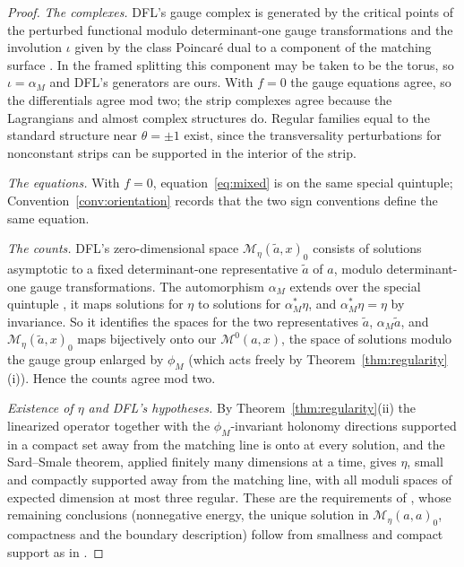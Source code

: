 \documentclass[11pt]{amsart}
\theoremstyle{definition}
\theoremstyle{remark}
\theoremstyle{plain}
\numberwithin{equation}{section}
\newcommand{\cM}{\mathcal{M}}
\begin{document}
\begin{proof}
\emph{The complexes.} DFL's gauge complex is generated by the critical points of
the perturbed functional modulo determinant-one gauge transformations and the
involution $\iota$ given by the class Poincaré dual to a component of the matching
surface \cite[pp.~18--19, Lemmas~2.43 and~2.45]{DFL}. In the framed splitting this
component may be taken to be the torus, so $\iota=\alpha_M$ and DFL's generators are
ours. With $f=0$ the gauge equations agree, so the differentials agree mod two; the
strip complexes agree because the Lagrangians and almost complex structures do.
Regular families equal to the standard structure near $\theta=\pm1$ exist, since the
transversality perturbations for nonconstant strips can be supported in the interior of
the strip.

\emph{The equations.} With $f=0$, equation~\eqref{eq:mixed} is \cite[(3.22)]{DFL}
on the same special quintuple; Convention~\ref{conv:orientation} records that the
two sign conventions define the same equation.

\emph{The counts.} DFL's zero-dimensional space $\cM_\eta(\tilde a,x)_0$ consists of
solutions asymptotic to a fixed determinant-one representative $\tilde a$ of $a$,
modulo determinant-one gauge transformations. The automorphism $\alpha_M$ extends over
the special quintuple \cite[Remark~3.7]{DFL}, it maps solutions for $\eta$ to solutions
for $\alpha_M^*\eta$, and $\alpha_M^*\eta=\eta$ by invariance. So it identifies the spaces
for the two representatives $\tilde a$, $\alpha_M\tilde a$, and $\cM_\eta(\tilde a,x)_0$ maps
bijectively onto our $\cM^0(a,x)$, the space of solutions modulo the gauge group
enlarged by $\phi_M$ (which acts freely by Theorem~\ref{thm:regularity}(i)). Hence the
counts agree mod two.

\emph{Existence of $\eta$ and DFL's hypotheses.} By Theorem~\ref{thm:regularity}(ii) the
linearized operator together with the $\phi_M$-invariant holonomy directions supported
in a compact set away from the matching line is onto at every solution, and the
Sard--Smale theorem, applied finitely many dimensions at a time, gives $\eta$, small
and compactly supported away from the matching line, with all moduli spaces of
expected dimension at most three regular. These are the requirements of
\cite[Propositions~3.23 and~3.26]{DFL}, whose remaining conclusions (nonnegative
energy, the unique solution in $\cM_\eta(a,a)_0$, compactness and the boundary
description) follow from smallness and compact support as in
\cite[Section~5]{DFL}.
\end{proof}
\end{document}
